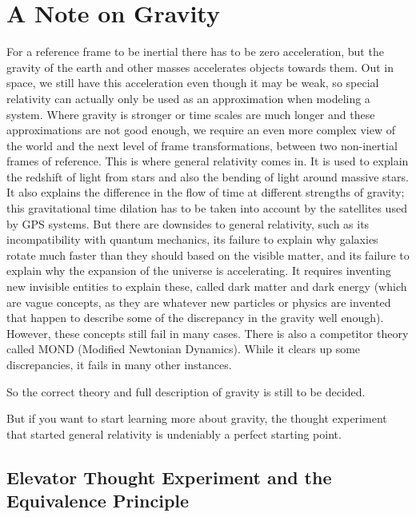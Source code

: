
\section{A Note on Gravity}\label{sect: A Note on Gravity}

For a reference frame to be inertial there has to be zero acceleration, but the gravity of the earth and other masses accelerates objects towards them.
Out in space, we still have this acceleration even though it may be weak, so special relativity can actually only be used as an approximation when modeling a system.
Where gravity is stronger or time scales are much longer and these approximations are not good enough, we require an even more complex view of the world and the next level of frame transformations, between two non-inertial frames of reference.
This is where general relativity comes in.
It is used to explain the redshift of light from stars and also the bending of light around massive stars.
It also explains the difference in the flow of time at different strengths of gravity; this gravitational time dilation has to be taken into account by the satellites used by GPS systems.
But there are downsides to general relativity, such as its incompatibility with quantum mechanics, its failure to explain why galaxies rotate much faster than they should based on the visible matter, and its failure to explain why the expansion of the universe is accelerating.
It requires inventing new invisible entities to explain these, called dark matter and dark energy (which are vague concepts, as they are whatever new particles or physics are invented that happen to describe some of the discrepancy in the gravity well enough).
However, these concepts still fail in many cases.
There is also a competitor theory called MOND (Modified Newtonian Dynamics).
While it clears up some discrepancies, it fails in many other instances.

So the correct theory and full description of gravity is still to be decided.

But if you want to start learning more about gravity, the thought experiment that started general relativity is undeniably a perfect starting point.

\subsection{Elevator Thought Experiment and the Equivalence Principle}
\label{subsect: Elevator Thought Experiment and the Equivalence Principle}

